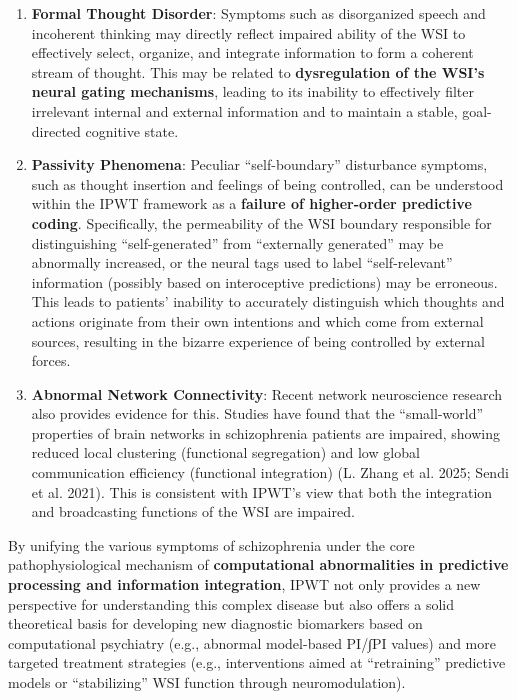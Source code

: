 \documentclass[
  a4paper]{article}
\providecommand{\tightlist}{%
  \setlength{\itemsep}{0pt}\setlength{\parskip}{0pt}}
\begin{document}
\begin{itemize}
  \begin{enumerate}
  \def\labelenumi{\arabic{enumi}.}
  \tightlist
  \item
    \textbf{Formal Thought Disorder}: Symptoms such as disorganized
    speech and incoherent thinking may directly reflect impaired ability
    of the WSI to effectively select, organize, and integrate
    information to form a coherent stream of thought. This may be
    related to \textbf{dysregulation of the WSI's neural gating
    mechanisms}, leading to its inability to effectively filter
    irrelevant internal and external information and to maintain a
    stable, goal-directed cognitive state.
  \item
    \textbf{Passivity Phenomena}: Peculiar ``self-boundary'' disturbance
    symptoms, such as thought insertion and feelings of being
    controlled, can be understood within the IPWT framework as a
    \textbf{failure of higher-order predictive coding}. Specifically,
    the permeability of the WSI boundary responsible for distinguishing
    ``self-generated'' from ``externally generated'' may be abnormally
    increased, or the neural tags used to label ``self-relevant''
    information (possibly based on interoceptive predictions) may be
    erroneous. This leads to patients' inability to accurately
    distinguish which thoughts and actions originate from their own
    intentions and which come from external sources, resulting in the
    bizarre experience of being controlled by external forces.
  \item
    \textbf{Abnormal Network Connectivity}: Recent network neuroscience
    research also provides evidence for this. Studies have found that
    the ``small-world'' properties of brain networks in schizophrenia
    patients are impaired, showing reduced local clustering (functional
    segregation) and low global communication efficiency (functional
    integration) (L. Zhang et al. 2025; Sendi et al. 2021). This is
    consistent with IPWT's view that both the integration and
    broadcasting functions of the WSI are impaired.
  \end{enumerate}
\end{itemize}

By unifying the various symptoms of schizophrenia under the core
pathophysiological mechanism of \textbf{computational abnormalities in
predictive processing and information integration}, IPWT not only
provides a new perspective for understanding this complex disease but
also offers a solid theoretical basis for developing new diagnostic
biomarkers based on computational psychiatry (e.g., abnormal model-based
PI/∫PI values) and more targeted treatment strategies (e.g.,
interventions aimed at ``retraining'' predictive models or
``stabilizing'' WSI function through neuromodulation).
\end{document}
